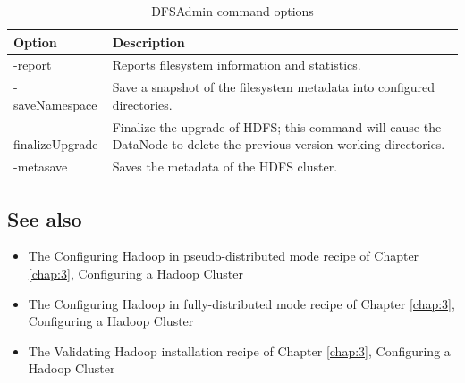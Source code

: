 \begin{table}
  \centering
  \begin{tabular}{lp{}}
    \toprule 
    \textbf{Option} & \textbf{Description} \\ \midrule 
    -report & Reports filesystem information and statistics. \\ 
    -saveNamespace & Save a snapshot of the filesystem metadata into configured directories. \\
    -finalizeUpgrade & Finalize the upgrade of HDFS; this command will cause the DataNode to delete the previous version working directories. \\
    -metasave & Saves the metadata of the HDFS cluster. \\ \bottomrule 
  \end{tabular}
  \caption{DFSAdmin command options}\label{tbl:dfsadmin}
\end{table}

\subsection*{See also}
\begin{itemize}
  \item The Configuring Hadoop in pseudo-distributed mode recipe of Chapter \ref{chap:3}, Configuring a Hadoop Cluster
  \item The Configuring Hadoop in fully-distributed mode recipe of Chapter \ref{chap:3}, Configuring a Hadoop Cluster
  \item The Validating Hadoop installation recipe of Chapter \ref{chap:3}, Configuring a Hadoop Cluster
\end{itemize}
